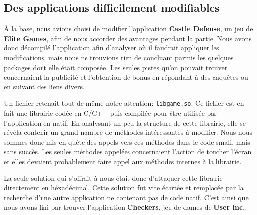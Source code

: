 
\subsection{Des applications difficilement modifiables}

À la base, nous avions choisi de modifier l'application \textbf{Castle Defense}, un jeu de \textbf{Elite Games},
afin de nous accorder des avantages pendant la partie.
Nous avons donc décompilé l'application afin d'analyser où il faudrait appliquer les modifications,
mais nous ne trouvions rien de concluant parmis les quelques packages dont elle était composée.
Les seules pistes qu'on pouvait trouver concernaient la publicité et l'obtention de bonus en répondant à des enquêtes ou en suivant des liens divers.

Un fichier retenait tout de même notre attention: \texttt{libgame.so}.
Ce fichier est en fait une librairie codée en C/C++ puis compilée pour être utilisée par l'application en natif.
En analysant un peu la structure de cette librairie, elle se révéla contenir un grand nombre de méthodes intéressantes à modifier.
Nous nous sommes donc mis en quête des appels vers ces méthodes dans le code smali, mais sans succès.
Les seules méthodes appelées concernaient l'action de toucher l'écran et elles devaient probablement faire appel aux méthodes internes à la librairie.

La seule solution qui s'offrait à nous était donc d'attaquer cette librairie directement en héxadécimal.
Cette solution fut vite écartée et remplacée par la recherche d'une autre application ne contenant pas de code natif.
C'est ainsi que nous avons fini par trouver l'application \textbf{Checkers}, jeu de dames de \textbf{User inc.}.